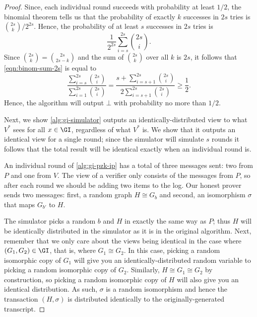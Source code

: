 \documentclass[english,12pt]{reedthesis}
\theoremstyle{plain}
\theoremstyle{definition}
\theoremstyle{remark}
\begin{document}
\begin{proof}
  Since, each individual round succeeds with probability at least $1/2$, the
  binomial theorem tells us that the probability of exactly $k$ successes in
  $2s$ tries is $\binom{2s}{k}/2^{2s}$. Hence, the probability of at least $s$
  successes in $2s$ tries is
  \begin{equation}\label{eqn:binom-sum-2s}
    \frac{1}{2^{2s}}\sum_{i=s}^{2s}\binom{2s}{i}.
  \end{equation}
  Since $\binom{2s}{k} = \binom{2s}{2s - k}$ and the sum of $\binom{2s}{k}$ over
  all $k$ is $2s$, it follows that \cref{eqn:binom-sum-2s} is equal to
  \begin{equation}
    \frac{\displaystyle \sum_{i=s}^{2s}\binom{2s}{i}}{\displaystyle \sum_{i=1}^{2s}\binom{2s}{i}}
    = \frac{\displaystyle s + \sum_{i=s+1}^{2s}\binom{2s}{i}}{2\displaystyle \sum_{i=s+1}^{2s}\binom{2s}{i}}
    \ge \frac{1}{2}.
  \end{equation}
  Hence, the algorithm will output $\bot$ with probability no more than $1/2$.

  Next, we show \cref{alg:gi-simulator} outputs an identically-distributed view
  to what $V^{*}$ sees for all $x \in \GI$, regardless of what $V^{*}$ is. We show
  that it outputs an identical view for a single round; since the simulator will
  simulate $s$ rounds it follows that the total result will be identical exactly
  when an individual round is.

  An individual round of \cref{alg:gi-pzk-ip} has a total of three messages
  sent: two from $P$ and one from $V$. The view of a verifier only consists of
  the messages from $P$, so after each round we should be adding two items to
  the log. Our honest prover sends two messages: first, a random graph
  $H \cong G_{b}$ and second, an isomorphism $\sigma$ that maps $G_{b'}$ to $H$.

  The simulator picks a random $b$ and $H$ in exactly the same way as $P$; thus
  $H$ will be identically distributed in the simulator as it is in the original
  algorithm. Next, remember that we only care about the views being identical in
  the case where $(G_{1}, G_{2}) \in \GI$, that is, where $G_{1} \cong G_{2}$. In this
  case, picking a random isomorphic copy of $G_{1}$ will give you an
  identically-distributed random variable to picking a random isomorphic copy of
  $G_{2}$. Similarly, $H \cong G_{1} \cong G_{2}$ by construction, so picking a random
  isomorphic copy of $H$ will also give you an identical distribution. As such,
  $\sigma$ is a random isomorphism and hence the transaction $(H, \sigma)$ is distributed
  identically to the originally-generated transcript.
\end{proof}
\end{document}
